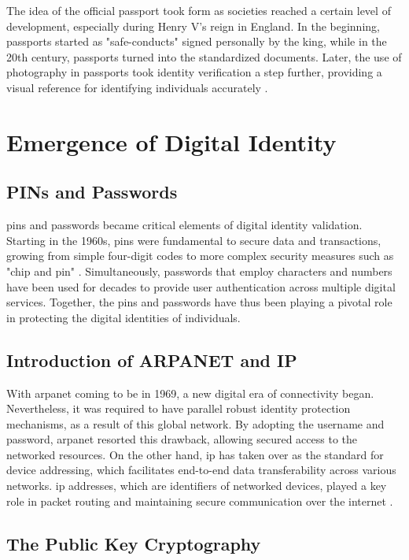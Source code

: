 The idea of the official passport took form as societies reached a certain level of development,  especially during Henry V's reign in England. In the beginning, 
passports started as "safe-conducts" signed personally by the king, while in the 20th century, passports turned into the standardized documents. Later, the use of 
photography in passports took identity verification a step further, providing a visual reference for identifying individuals accurately \cite{businessreporter}.

\section{Emergence of Digital Identity}

\subsection{PINs and Passwords}

\gls{pin}s and passwords became critical elements of digital identity validation. Starting in the 1960s, \gls{pin}s were fundamental to secure data and transactions, growing 
from simple four-digit codes to more complex security measures such as "chip and pin" \cite{mediumdigitalidentity}. Simultaneously, passwords that employ characters and 
numbers have been used for decades to provide user authentication across multiple digital services. Together, the \gls{pin}s and passwords have thus been playing a pivotal 
role in protecting the digital identities of individuals.

\subsection{Introduction of ARPANET and IP}

With \gls{arpanet} coming to be in 1969, a new digital era of connectivity began. Nevertheless, it was required to have parallel robust identity protection mechanisms, as a 
result of this global network. By adopting the username and password, \gls{arpanet} resorted this drawback, allowing secured access to the networked resources. On the other hand, 
\gls{ip} has taken over as the standard for device addressing, which facilitates end-to-end data transferability across various networks. \gls{ip} addresses, which are 
identifiers of networked devices, played a key role in packet routing and maintaining secure communication over the internet \cite{mediumdigitalidentity}.

\subsection{The Public Key Cryptography}

